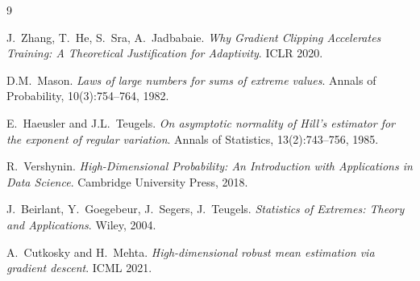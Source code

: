 \documentclass[11pt]{article}
\theoremstyle{definition}
\begin{document}
\begin{thebibliography}{9}

  J.\ Zhang, T.\ He, S.\ Sra, A.\ Jadbabaie.
  \textit{Why Gradient Clipping Accelerates Training: A Theoretical Justification
  for Adaptivity}. ICLR 2020.

  D.M.\ Mason.
  \textit{Laws of large numbers for sums of extreme values}.
  Annals of Probability, 10(3):754--764, 1982.

  E.\ Haeusler and J.L.\ Teugels.
  \textit{On asymptotic normality of Hill's estimator for the exponent of
  regular variation}. Annals of Statistics, 13(2):743--756, 1985.

  R.\ Vershynin.
  \textit{High-Dimensional Probability: An Introduction with Applications in
  Data Science}. Cambridge University Press, 2018.

  J.\ Beirlant, Y.\ Goegebeur, J.\ Segers, J.\ Teugels.
  \textit{Statistics of Extremes: Theory and Applications}. Wiley, 2004.

  A.\ Cutkosky and H.\ Mehta.
  \textit{High-dimensional robust mean estimation via gradient descent}.
  ICML 2021.

\end{thebibliography}
\end{document}
